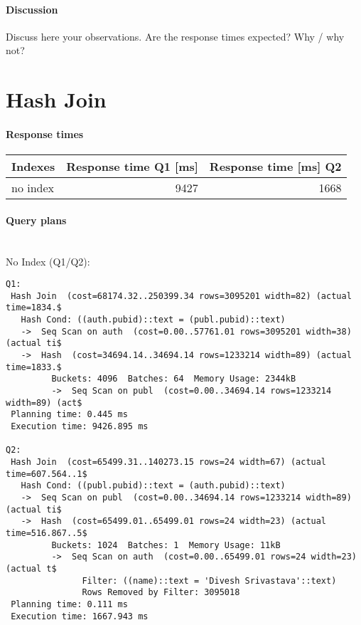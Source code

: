 \documentclass[11pt]{scrartcl}
\begin{document}
\paragraph{Discussion}
Discuss here your observations. Are the response times expected? Why
/ why not? 

\section{Hash Join}

\paragraph{Response times}

\begin{flushleft}
\begin{tabular}{l|r|r}
  Indexes & Response time Q1 [ms] & Response time [ms] Q2 \\
  \hline
  no index & 9427 & 1668 \\
\end{tabular}
\end{flushleft}

\paragraph{Query plans}\mbox{}\\ 

\noindent No Index (Q1/Q2):
{\small
\begin{verbatim}
Q1:
 Hash Join  (cost=68174.32..250399.34 rows=3095201 width=82) (actual time=1834.$
   Hash Cond: ((auth.pubid)::text = (publ.pubid)::text)
   ->  Seq Scan on auth  (cost=0.00..57761.01 rows=3095201 width=38) (actual ti$
   ->  Hash  (cost=34694.14..34694.14 rows=1233214 width=89) (actual time=1833.$
         Buckets: 4096  Batches: 64  Memory Usage: 2344kB
         ->  Seq Scan on publ  (cost=0.00..34694.14 rows=1233214 width=89) (act$
 Planning time: 0.445 ms
 Execution time: 9426.895 ms

Q2:
 Hash Join  (cost=65499.31..140273.15 rows=24 width=67) (actual time=607.564..1$
   Hash Cond: ((publ.pubid)::text = (auth.pubid)::text)
   ->  Seq Scan on publ  (cost=0.00..34694.14 rows=1233214 width=89) (actual ti$
   ->  Hash  (cost=65499.01..65499.01 rows=24 width=23) (actual time=516.867..5$
         Buckets: 1024  Batches: 1  Memory Usage: 11kB
         ->  Seq Scan on auth  (cost=0.00..65499.01 rows=24 width=23) (actual t$
               Filter: ((name)::text = 'Divesh Srivastava'::text)
               Rows Removed by Filter: 3095018
 Planning time: 0.111 ms
 Execution time: 1667.943 ms

\end{verbatim}
}
\end{document}
